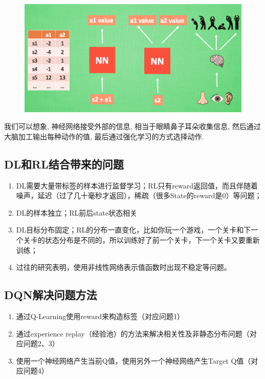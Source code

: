 \documentclass[UTF8,a4paper,12pt]{ctexbook}
\begin{document}
			\begin{figure}[H]
				\centering
				\includegraphics[width=.9\linewidth]{DQN2}
			\end{figure}
		
			我们可以想象, 神经网络接受外部的信息, 相当于眼睛鼻子耳朵收集信息, 然后通过大脑加工输出每种动作的值, 最后通过强化学习的方式选择动作.
		
		\subsection{DL和RL结合带来的问题}
			\begin{enumerate}
				\item DL需要大量带标签的样本进行监督学习；RL只有reward返回值，而且伴随着噪声，延迟（过了几十毫秒才返回），稀疏（很多State的reward是0）等问题；
				\item DL的样本独立；RL前后state状态相关
				\item DL目标分布固定；RL的分布一直变化，比如你玩一个游戏，一个关卡和下一个关卡的状态分布是不同的，所以训练好了前一个关卡，下一个关卡又要重新训练；
				\item 过往的研究表明，使用非线性网络表示值函数时出现不稳定等问题。
			\end{enumerate}
		
		\subsection{DQN解决问题方法}
			\begin{enumerate}
				\item 通过Q-Learning使用reward来构造标签（对应问题1）
				\item 通过experience replay（经验池）的方法来解决相关性及非静态分布问题（对应问题2、3）
				\item 使用一个神经网络产生当前Q值，使用另外一个神经网络产生Target Q值（对应问题4）
			\end{enumerate}
			
\end{document}
